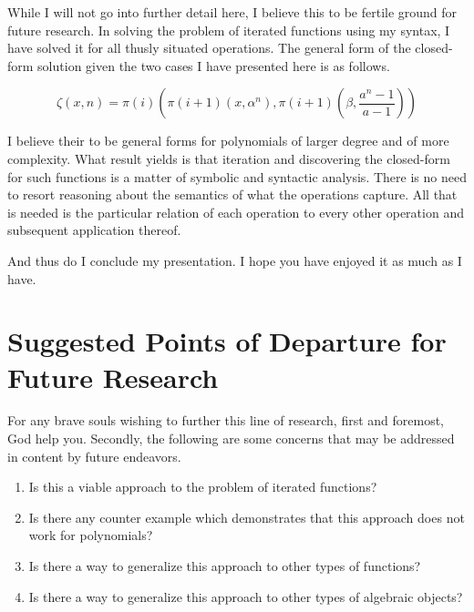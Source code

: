 \documentclass[12pt]{article}
\begin{document}
While I will not go into further detail here, I believe this to be fertile
ground for future research. In solving the problem of iterated functions using
my syntax, I have solved it for all thusly situated operations. The general
form of the closed-form solution given the two cases I have presented here is
as follows.

\begin{equation}
    \zeta(x,n) = \pi(i)(\pi(i+1)(x, \alpha^n), \pi(i+1)(\beta, \frac{a^n-1}{a-1}))
\end{equation}

I believe their to be general forms for polynomials of larger degree and of
more complexity. What result yields is that iteration and discovering the
closed-form for such functions is a matter of symbolic and syntactic analysis.
There is no need to resort reasoning about the semantics of what the operations
capture. All that is needed is the particular relation of each operation to
every other operation and subsequent application thereof.

And thus do I conclude my presentation. I hope you have enjoyed it as much as I
have.

\section{Suggested Points of Departure for Future Research}
For any brave souls wishing to further this line of research, first and
foremost, God help you. Secondly, the following are some concerns that may be
addressed in content by future endeavors.

\begin{enumerate}
    \item Is this a viable approach to the problem of iterated functions?
    \item Is there any counter example which demonstrates that this approach does not
          work for polynomials?
    \item Is there a way to generalize this approach to other types of functions?
    \item Is there a way to generalize this approach to other types of algebraic objects?
\end{enumerate}
\end{document}

